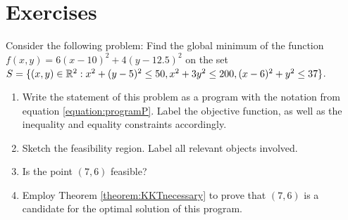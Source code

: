 
\section*{Exercises}

\begin{problem}[Basic]
Consider the following problem: Find the global minimum of the function $f(x,y) = 6(x-10)^2+4(y-12.5)^2$ on the set $S = \{ (x,y) \in \mathbb{R}^2 : x^2+(y-5)^2 \leq 50, x^2+3y^2\leq 200, (x-6)^2+y^2 \leq 37 \}$.
\begin{enumerate}
	\item Write the statement of this problem as a program with the notation from equation \ref{equation:programP}.  Label the objective function, as well as the inequality and equality constraints accordingly.
	\item Sketch the feasibility region.  Label all relevant objects involved.
	\item Is the point $(7,6)$ feasible?
	\item Employ Theorem \ref{theorem:KKTnecessary} to prove that $(7,6)$ is a candidate for the optimal solution of this program.
\end{enumerate}
\end{problem}

